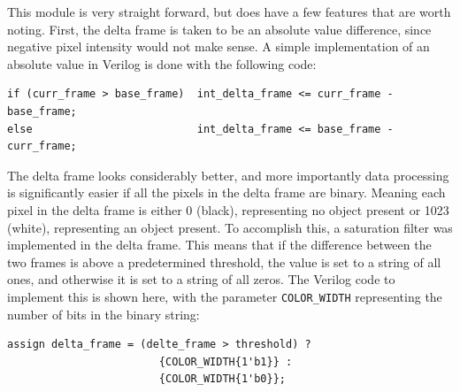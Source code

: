 \documentclass[11pt]{article} %
\begin{document}
This module is very straight forward, but does have a few features that are worth noting. First, the delta frame is taken to be an absolute value difference, since negative pixel intensity would not make sense. A simple implementation of an absolute value in Verilog is done with the following code:
\begin{verbatim}
if (curr_frame > base_frame)  int_delta_frame <= curr_frame - base_frame;
else                          int_delta_frame <= base_frame - curr_frame;
\end{verbatim}
The delta frame looks considerably better, and more importantly data processing is significantly easier if all the pixels in the delta frame are binary. Meaning each pixel in the delta frame is either 0 (black), representing no object present or 1023 (white), representing an object present. To accomplish this, a saturation filter was implemented in the delta frame. This means that if the difference between the two frames is above a predetermined threshold, the value is set to a string of all ones, and otherwise it is set to a string of all zeros. The Verilog code to implement this is shown here, with the parameter \texttt{COLOR\_WIDTH} representing the number of bits in the binary string:
\begin{verbatim}
assign delta_frame = (delte_frame > threshold) ? 
						{COLOR_WIDTH{1'b1}} :
						{COLOR_WIDTH{1'b0}};
\end{verbatim}
\end{document}
